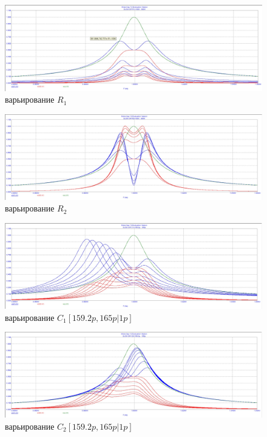 \documentclass[a4paper, 14pt]{extarticle}%
\begin{document}
\begin{figure}[h!]
	\centering
			\includegraphics[width=1.1\linewidth]{1.2_varR1.jpg}
            \caption{варьирование $R_1$}
	\label{A}
\end{figure}

\begin{figure}[h!]
	\centering
			\includegraphics[width=1.1\linewidth]{1.2_varR2.jpg}
            \caption{варьирование $R_2$}
	\label{A}
\end{figure}


\begin{figure}[h!]
	\centering
			\includegraphics[width=1.1\linewidth]{1.2_varC1.jpg}
            \caption{варьирование $C_1 [159.2p, 165p|1p]$}
	\label{A}
\end{figure}


\begin{figure}[h!]
	\centering
			\includegraphics[width=1.1\linewidth]{1.2_varC2.jpg}
            \caption{варьирование $C_2 [159.2p, 165p|1p]$}
	\label{A}
\end{figure}
\end{document}
